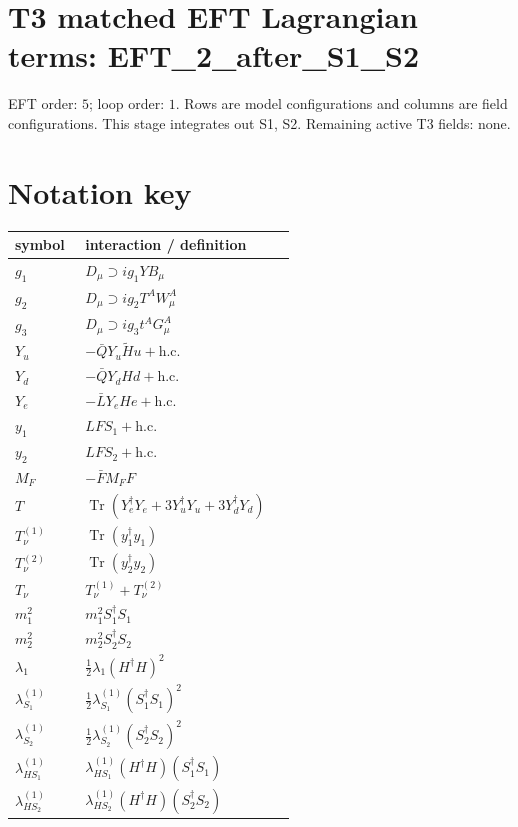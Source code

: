 \documentclass[8pt]{article}
\begin{document}
\begin{landscape}
\section*{T3 matched EFT Lagrangian terms: EFT\_2\_after\_S1\_S2}
EFT order: $5$; loop order: $1$. 
Rows are model configurations and columns are field configurations. This stage integrates out S1, S2. Remaining active T3 fields: none.
\section*{Notation key}
\begin{longtable}{@{}p{0.23\linewidth}p{0.69\linewidth}@{}}
\toprule
symbol & interaction / definition \\
\midrule
$g_1$ & $D_\mu\supset i g_1YB_\mu$ \\
$g_2$ & $D_\mu\supset i g_2T^AW_\mu^A$ \\
$g_3$ & $D_\mu\supset i g_3t^AG_\mu^A$ \\
$Y_u$ & $-\bar QY_u\widetilde Hu+\mathrm{h.c.}$ \\
$Y_d$ & $-\bar QY_dHd+\mathrm{h.c.}$ \\
$Y_e$ & $-\bar LY_eHe+\mathrm{h.c.}$ \\
$y_1$ & $LFS_1+\mathrm{h.c.}$ \\
$y_2$ & $LFS_2+\mathrm{h.c.}$ \\
$M_F$ & $-\bar FM_FF$ \\
$T$ & $\operatorname{Tr}(Y_e^\dagger Y_e+3Y_u^\dagger Y_u+3Y_d^\dagger Y_d)$ \\
$T_\nu^{(1)}$ & $\operatorname{Tr}(y_1^\dagger y_1)$ \\
$T_\nu^{(2)}$ & $\operatorname{Tr}(y_2^\dagger y_2)$ \\
$T_\nu$ & $T_\nu^{(1)}+T_\nu^{(2)}$ \\
$m_1^2$ & $m_1^2S_1^\dagger S_1$ \\
$m_2^2$ & $m_2^2S_2^\dagger S_2$ \\
$\lambda_1$ & $\frac12\lambda_1(H^\dagger H)^2$ \\
$\lambda_{S_1}^{(1)}$ & $\frac12\lambda_{S_1}^{(1)}(S_1^\dagger S_1)^2$ \\
$\lambda_{S_2}^{(1)}$ & $\frac12\lambda_{S_2}^{(1)}(S_2^\dagger S_2)^2$ \\
$\lambda_{HS_1}^{(1)}$ & $\lambda_{HS_1}^{(1)}(H^\dagger H)(S_1^\dagger S_1)$ \\
$\lambda_{HS_2}^{(1)}$ & $\lambda_{HS_2}^{(1)}(H^\dagger H)(S_2^\dagger S_2)$ \\

\end{longtable}
\end{landscape}
\end{document}
